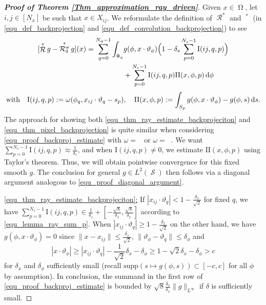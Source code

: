 \documentclass[11pt,reqno]{amsart}
\newcommand{\supp}[1]{\mathrm{supp}\left( #1 \right)}
\newcommand{\sums}{\sum_{p=0}^{N_s-1}}
\newcommand{\sumphi}{\sum_{q=0}^{N_\phi-1}}
\newcommand{\I}{\mathrm{I}}
\newcommand{\II}{\mathrm{II}}
\DeclareMathOperator{\Radon}{\mathcal{R}}
\DeclareMathOperator{\GenRadon}{\mathcal{R}^\omega_{\delta}}
\DeclareMathOperator{\RayWeight}{\omega^\mathrm{rd}_{\delta_\mathit{x}}}
\DeclareMathOperator{\PixelWeight}{\omega^\mathrm{pd}_{\delta_\mathit{s}}}
\DeclareMathOperator{\imgdom}{\Omega}
\DeclareMathOperator{\sinodom}{\mathcal{S}}
\newcommand{\dd}[1]{\,\mathrm{d}{#1}}
\numberwithin{theorem}{section}
\theoremstyle{remark}
\begin{document}
\begin{proof}[\textbf{Proof of Theorem \ref{Thm_approximation_ray_driven}}]
  Given $x \in \imgdom$, let $i,j\in [N_x]$ be such that $x\in X_{ij}$. We reformulate the definition of $\Radon^*$ and $\GenRadon^* $  (in \eqref{equ_def_backprojection} and \eqref{equ_def_convolution_backprojection}) to see
 \begin{align} \label{equ_proof_backproj_estimate}
        [\Radon^* g- \GenRadon^* g](x) \notag
        = \sumphi \int_{\Phi_q} &g(\phi,x\cdot \vartheta_\phi) \Big(1-\delta_s\sums \I(ij,q,p) \Big ) 
        \\
        &+ \sums \I(ij,q,p) \II(x,\phi,p) \dd \phi 
        \end{align}
\begin{equation}
 \text{with} \quad        \I(ij,q,p ):=
\omega(\phi_q,x_{ij}\cdot \vartheta_q-s_p), 
\quad
\II(x,\phi,p) :=\int_{S_p} g(\phi, x\cdot \vartheta_\phi) - g(\phi,s) \dd s. \notag
    \end{equation}
The approach for showing both  \eqref{equ_thm_ray_estimate_backprojeciton} and \eqref{equ_thm_pixel_backprojection} is quite similar when considering \eqref{equ_proof_backproj_estimate} with $\omega=\RayWeight$ or $\omega=\PixelWeight$. We want $\sums\I(ij,q,p) \approx \frac{1}{\delta_s}$, and when $\I(ij,q,p)\neq 0$, we estimate $\II(x,\phi,p)$ using Taylor's theorem. Thus, we will obtain pointwise convergence for this fixed smooth $g$.
The conclusion for general $g\in L^2(\sinodom)$ then follows via a diagonal argument analogous to \eqref{equ_proof_diagonal_argument}.

       

   \underline{\eqref{equ_thm_ray_estimate_backprojeciton}:} If $|x_{ij} \cdot\vartheta_q|<1-\frac{\delta_x}{\sqrt{2}} $  for fixed $q$, we have $\sums \I(ij,q,p) \in \frac{1}{\delta_s}+[-\frac{\sqrt{8}}{\delta_x},\frac{\sqrt{8}}{\delta_x}]$ according to \eqref{equ_lemma_ray_sum_p}. When $|x_{ij} \cdot\vartheta_q|\geq 1-\frac{\delta_x}{\sqrt{2}} $ on the other hand, we have $g(\phi,x\cdot\vartheta_\phi)=0$
since  $\|x-x_{ij}\|\leq\frac{\delta_x}{\sqrt{2}}$, $\|\vartheta_\phi-\vartheta_q\|\leq \delta_\phi$ and 
\begin{equation}
|x\cdot \vartheta_\phi|\geq |x_{ij}\cdot \vartheta_q|-\frac{1}{\sqrt{2}}\delta_x-\delta_\phi \geq 1 - \sqrt{2} \delta_x-\delta_\phi >c
\end{equation}
 for $\delta_x$ and $\delta_\phi$ sufficiently small (recall $\supp{s\mapsto g(\phi,s)}\subset [-c,c]$ for all $\phi$ by assumption).  In conclusion, the summand in the first row of \eqref{equ_proof_backproj_estimate} is bounded by $\sqrt{8}\frac{\delta_s}{\delta_x} \|g\|_{L^\infty}$ if $\delta$ is sufficiently small.
    

\end{proof}
\end{document}
